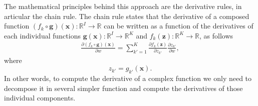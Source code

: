 The mathematical principles behind this approach are the derivative rules, in articular the chain rule. 
The chain rule states that the derivative of a composed function $({f_k} \circ \mathbf{g})(\mathbf{x}) : \mathbb{R}^{I} \rightarrow \mathbb{R}$ can be written as a function of the derivatives of each individual functions $\mathbf{g}(\mathbf{x}): \mathbb{R}^{I} \rightarrow \mathbb{R}^{K}$ and ${f_k(\mathbf{z})}: \mathbb{R}^{K} \rightarrow \mathbb{R}$, as follows
%
\begin{align}
\frac{\partial (f_{k} \circ \mathbf{g})(\mathbf{x}) }{\partial w} = \sum_{k'=1}^{K}\frac{\partial f_{k}(\mathbf{z})}{\partial z_{k'}}\frac{\partial z_{k'}}{\partial w},
\label{eq:chainRule}
\end{align}
%
where 
%
\begin{equation}
z_{k'} = g_{k'}(\mathbf{x}).
\end{equation}
%
In other words, to compute the derivative of a complex function we only need
to decompose it in several simpler function and compute the derivatives of those individual components. 


